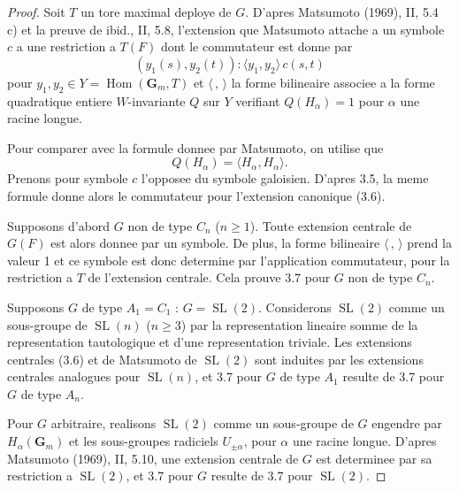 \documentclass[11pt,a4paper]{article}
\theoremstyle{plain}
\theoremstyle{definition}
\DeclareMathOperator{\Hom}{Hom}
\DeclareMathOperator{\SL}{SL}
\begin{document}
\begin{proof}
Soit $T$ un tore maximal deploye de $G$. D'apres Matsumoto (1969), II, 5.4 c) et la preuve de ibid., II, 5.8, l'extension que Matsumoto attache a un symbole $c$ a une restriction a $T(F)$ dont le commutateur est donne par
\begin{equation}\label{3.7.1}
(y_1(s), y_2(t)) : \langle y_1, y_2 \rangle \, c(s, t)
\end{equation}
pour $y_1, y_2 \in Y = \Hom(\mathbf{G}_m, T)$ et $\langle \, , \, \rangle$ la forme bilineaire associee a la forme quadratique entiere $W$-invariante $Q$ sur $Y$ verifiant $Q(H_\alpha) = 1$ pour $\alpha$ une racine longue.

Pour comparer avec la formule donnee par Matsumoto, on utilise que
\[
Q(H_\alpha) = \langle H_\alpha, H_\alpha \rangle.
\]
Prenons pour symbole $c$ l'opposee du symbole galoisien. D'apres 3.5, la meme formule donne alors le commutateur pour l'extension canonique (3.6).

Supposons d'abord $G$ non de type $C_n$ ($n \geq 1$). Toute extension centrale de $G(F)$ est alors donnee par un symbole. De plus, la forme bilineaire $\langle \, , \, \rangle$ prend la valeur 1 et ce symbole est donc determine par l'application commutateur, pour la restriction a $T$ de l'extension centrale. Cela prouve 3.7 pour $G$ non de type $C_n$.

Supposons $G$ de type $A_1 = C_1$ : $G = \SL(2)$. Considerons $\SL(2)$ comme un sous-groupe de $\SL(n)$ ($n \geq 3$) par la representation lineaire somme de la representation tautologique et d'une representation triviale. Les extensions centrales (3.6) et de Matsumoto de $\SL(2)$ sont induites par les extensions centrales analogues pour $\SL(n)$, et 3.7 pour $G$ de type $A_1$ resulte de 3.7 pour $G$ de type $A_n$.

Pour $G$ arbitraire, realisons $\SL(2)$ comme un sous-groupe de $G$ engendre par $H_\alpha(\mathbf{G}_m)$ et les sous-groupes radiciels $U_{\pm\alpha}$, pour $\alpha$ une racine longue. D'apres Matsumoto (1969), II, 5.10, une extension centrale de $G$ est determinee par sa restriction a $\SL(2)$, et 3.7 pour $G$ resulte de 3.7 pour $\SL(2)$.
\end{proof}
\end{document}
